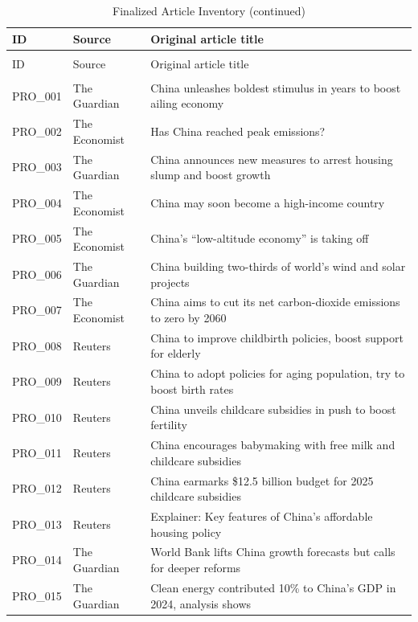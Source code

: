 \begingroup
\scriptsize
\setlength{\LTleft}{0pt}
\setlength{\LTright}{0pt}
\begin{longtable}{@{}p{1.5cm}p{2.6cm}p{9.8cm}@{}}
\caption{Finalized Article Inventory}
\label{tab:article_inventory}\\
\toprule
ID & Source & Original article title \\
\midrule
\endfirsthead
\caption[]{Finalized Article Inventory (continued)}\\
\toprule
ID & Source & Original article title \\
\midrule
\endhead
\bottomrule
\endfoot
\multicolumn{3}{l}{\textit{Pro-China}}\\
PRO\_001 & The Guardian & China unleashes boldest stimulus in years to boost ailing economy \\
PRO\_002 & The Economist & Has China reached peak emissions? \\
PRO\_003 & The Guardian & China announces new measures to arrest housing slump and boost growth \\
PRO\_004 & The Economist & China may soon become a high-income country \\
PRO\_005 & The Economist & China’s “low-altitude economy” is taking off \\
PRO\_006 & The Guardian & China building two-thirds of world’s wind and solar projects \\
PRO\_007 & The Economist & China aims to cut its net carbon-dioxide emissions to zero by 2060 \\
PRO\_008 & Reuters & China to improve childbirth policies, boost support for elderly \\
PRO\_009 & Reuters & China to adopt policies for aging population, try to boost birth rates \\
PRO\_010 & Reuters & China unveils childcare subsidies in push to boost fertility \\
PRO\_011 & Reuters & China encourages babymaking with free milk and childcare subsidies \\
PRO\_012 & Reuters & China earmarks \$12.5 billion budget for 2025 childcare subsidies \\
PRO\_013 & Reuters & Explainer: Key features of China's affordable housing policy \\
PRO\_014 & The Guardian & World Bank lifts China growth forecasts but calls for deeper reforms \\
PRO\_015 & The Guardian & Clean energy contributed 10\% to China’s GDP in 2024, analysis shows \\

\end{longtable}
